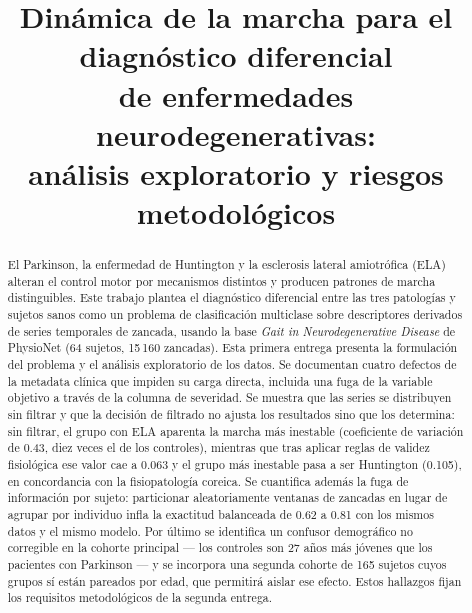 \documentclass[conference]{IEEEtran}
\begin{document}
\title{Dinámica de la marcha para el diagnóstico diferencial\\de enfermedades neurodegenerativas:\\análisis exploratorio y riesgos metodológicos}

\author{
}

\maketitle

\begin{abstract}
El Parkinson, la enfermedad de Huntington y la esclerosis lateral amiotrófica (ELA) alteran el control motor por mecanismos distintos y producen patrones de marcha distinguibles. Este trabajo plantea el diagnóstico diferencial entre las tres patologías y sujetos sanos como un problema de clasificación multiclase sobre descriptores derivados de series temporales de zancada, usando la base \textit{Gait in Neurodegenerative Disease} de PhysioNet (64 sujetos, 15\,160 zancadas). Esta primera entrega presenta la formulación del problema y el análisis exploratorio de los datos. Se documentan cuatro defectos de la metadata clínica que impiden su carga directa, incluida una fuga de la variable objetivo a través de la columna de severidad. Se muestra que las series se distribuyen sin filtrar y que la decisión de filtrado no ajusta los resultados sino que los determina: sin filtrar, el grupo con ELA aparenta la marcha más inestable (coeficiente de variación de 0.43, diez veces el de los controles), mientras que tras aplicar reglas de validez fisiológica ese valor cae a 0.063 y el grupo más inestable pasa a ser Huntington (0.105), en concordancia con la fisiopatología coreica. Se cuantifica además la fuga de información por sujeto: particionar aleatoriamente ventanas de zancadas en lugar de agrupar por individuo infla la exactitud balanceada de 0.62 a 0.81 con los mismos datos y el mismo modelo. Por último se identifica un confusor demográfico no corregible en la cohorte principal --- los controles son 27 años más jóvenes que los pacientes con Parkinson --- y se incorpora una segunda cohorte de 165 sujetos cuyos grupos sí están pareados por edad, que permitirá aislar ese efecto. Estos hallazgos fijan los requisitos metodológicos de la segunda entrega.
\end{abstract}
\end{document}
